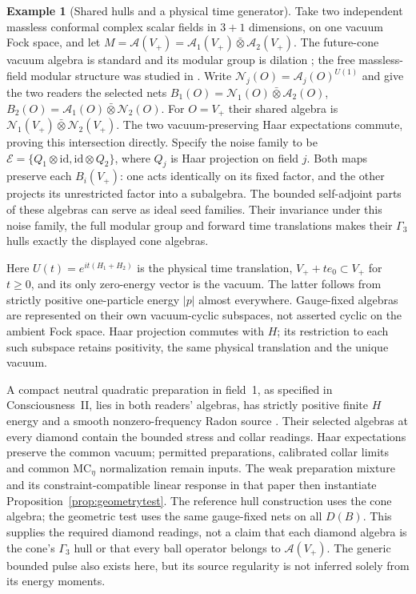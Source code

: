 \documentclass[12pt]{article}
\theoremstyle{definition}
\newtheorem{example}[theorem]{Example}
\theoremstyle{remark}
\begin{document}
\begin{example}[Shared hulls and a physical time generator]
\label{ex:sharedphysicalH}
Take two independent massless conformal complex scalar fields in
$3+1$ dimensions, on one vacuum Fock space, and let
$M=\mathcal A(V_+)=\mathcal A_1(V_+)\bar\otimes\mathcal A_2(V_+)$.
The future-cone vacuum algebra is standard and its modular group is
dilation \cite[Theorem~2.3(ii)]{BGL1993}; the free massless-field
modular structure was studied in \cite{HislopLongo1982}.
Write $\mathcal N_j(O)=\mathcal A_j(O)^{U(1)}$ and give the two readers
the selected nets
$B_1(O)=\mathcal N_1(O)\bar\otimes\mathcal A_2(O)$,
$B_2(O)=\mathcal A_1(O)\bar\otimes\mathcal N_2(O)$.
For $O=V_+$ their shared algebra is
$\mathcal N_1(V_+)\bar\otimes\mathcal N_2(V_+)$.
The two vacuum-preserving Haar expectations commute, proving this
intersection directly. Specify the noise family to be
$\mathcal E=\{Q_1\otimes\mathrm{id},\mathrm{id}\otimes Q_2\}$,
where $Q_j$ is Haar projection on field $j$. Both maps preserve
each $B_i(V_+)$: one acts identically on its fixed factor, and the
other projects its unrestricted factor into a subalgebra.
The bounded self-adjoint parts of these algebras can serve as ideal
seed families. Their invariance under this noise family, the full
modular group and forward time translations makes their $\Gamma_3$
hulls exactly the displayed cone algebras.

Here $U(t)=e^{it(H_1+H_2)}$ is the physical time translation,
$V_++te_0\subset V_+$ for $t\ge0$, and its only zero-energy vector
is the vacuum. The latter follows from strictly positive
one-particle energy $|p|$ almost everywhere. Gauge-fixed algebras
are represented on their own vacuum-cyclic subspaces, not asserted
cyclic on the ambient Fock space. Haar projection commutes with $H$;
its restriction to each such subspace retains positivity, the same
physical translation and the unique vacuum.

A compact neutral quadratic preparation in field~1, as specified in
Consciousness~II, lies in both readers' algebras, has strictly
positive finite $H$ energy and a smooth nonzero-frequency Radon
source \cite[Proposition on a neutral preparation]{PaperII}.
Their selected algebras at every diamond contain the bounded stress
and collar readings. Haar expectations preserve the common vacuum;
permitted preparations, calibrated collar limits and common
$\mathrm{MC}_\eta$ normalization remain inputs. The weak preparation mixture and its constraint-compatible
linear response in that paper then instantiate
Proposition~\ref{prop:geometrytest}.
The reference hull construction uses the cone algebra; the geometric
test uses the same gauge-fixed nets on all $D(B)$. This supplies the
required diamond readings, not a claim that each diamond algebra is
the cone's $\Gamma_3$ hull or that every ball operator belongs to
$\mathcal A(V_+)$. The generic bounded pulse also
exists here, but its source regularity is not inferred solely from
its energy moments.
\end{example}
\end{document}
